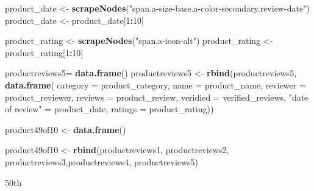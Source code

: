 \documentclass[
]{article}
\newenvironment{Shaded}{\begin{snugshade}}{\end{snugshade}}
\newcommand{\AttributeTok}[1]{\textcolor[rgb]{0.13,0.29,0.53}{#1}}
\newcommand{\DecValTok}[1]{\textcolor[rgb]{0.00,0.00,0.81}{#1}}
\newcommand{\FunctionTok}[1]{\textcolor[rgb]{0.13,0.29,0.53}{\textbf{#1}}}
\newcommand{\NormalTok}[1]{#1}
\newcommand{\OtherTok}[1]{\textcolor[rgb]{0.56,0.35,0.01}{#1}}
\newcommand{\SpecialCharTok}[1]{\textcolor[rgb]{0.81,0.36,0.00}{\textbf{#1}}}
\newcommand{\StringTok}[1]{\textcolor[rgb]{0.31,0.60,0.02}{#1}}
\begin{document}
\begin{Shaded}
\begin{Highlighting}[]
\NormalTok{  product\_date }\OtherTok{\textless{}{-}} \FunctionTok{scrapeNodes}\NormalTok{(}\StringTok{"span.a{-}size{-}base.a{-}color{-}secondary.review{-}date"}\NormalTok{)}
\NormalTok{  product\_date }\OtherTok{\textless{}{-}}\NormalTok{ product\_date[}\DecValTok{1}\SpecialCharTok{:}\DecValTok{10}\NormalTok{]}
  
\NormalTok{  product\_rating }\OtherTok{\textless{}{-}} \FunctionTok{scrapeNodes}\NormalTok{(}\StringTok{"span.a{-}icon{-}alt"}\NormalTok{)}
\NormalTok{  product\_rating }\OtherTok{\textless{}{-}}\NormalTok{ product\_rating[}\DecValTok{1}\SpecialCharTok{:}\DecValTok{10}\NormalTok{]}
  
\NormalTok{  productreviews5}\OtherTok{=} \FunctionTok{data.frame}\NormalTok{()}
\NormalTok{  productreviews5 }\OtherTok{\textless{}{-}} \FunctionTok{rbind}\NormalTok{(productreviews5, }\FunctionTok{data.frame}\NormalTok{(}
                      \AttributeTok{category =}\NormalTok{ product\_category,}
                      \AttributeTok{name =}\NormalTok{ product\_name,}
                      \AttributeTok{reviewer =}\NormalTok{ product\_reviewer,}
                      \AttributeTok{reviews =}\NormalTok{ product\_review,}
                      \AttributeTok{veridied =}\NormalTok{ verified\_reviews,}
                      \StringTok{"date of review"} \OtherTok{=}\NormalTok{ product\_date,}
                      \AttributeTok{ratings =}\NormalTok{ product\_rating))}
  
\NormalTok{  product49of10 }\OtherTok{\textless{}{-}} \FunctionTok{data.frame}\NormalTok{()}
  
\NormalTok{  product49of10 }\OtherTok{\textless{}{-}} \FunctionTok{rbind}\NormalTok{(productreviews1, productreviews2, productreviews3,productreviews4, productreviews5)}
\end{Highlighting}
\end{Shaded}

50th
\end{document}
